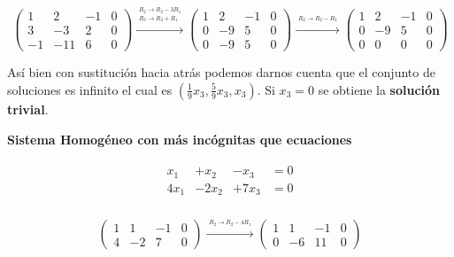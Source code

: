 \documentclass{article}
\begin{document}
\begin{equation}
    \left(\begin{array}{rrr|r}
        1 & 2 & -1 & 0 \\
        3 & -3 & 2 & 0 \\
        -1 & -11 & 6 & 0
    \end{array}\right) 
    \xrightarrow{\overset{\begin{aligned} R_2 \rightarrow R_2 - 3R_1 \\ R_3 \rightarrow R_3 + R_1\end{aligned}}{}} 
    \left(\begin{array}{rrr|r}
        1 & 2 & -1 & 0 \\
        0 & -9 & 5 & 0 \\
        0 & -9 & 5 & 0
    \end{array}\right)
    \xrightarrow{\overset{\begin{aligned} R_2 \rightarrow R_2 -R_3\end{aligned}}{}} 
    \left(\begin{array}{rrr|r}
        1 & 2 & -1 & 0 \\
        0 & -9 & 5 & 0 \\
        0 & 0 & 0 & 0
    \end{array}\right)
\end{equation}

Así bien con sustitución hacia atrás podemos darnos cuenta que el conjunto de soluciones es infinito el cual es $(\frac{1}{9} x_3, \frac{5}{9} x_3, x_3)$. Si $x_3 = 0$ se obtiene la \textbf{solución trivial}.

\begin{large}
    \textbf{Sistema Homogéneo con más incógnitas que ecuaciones}
\end{large}


\begin{equation*}
    \begin{matrix}
        \begin{aligned}
            x_1 & +x_2 & -x_3 & =0\\
            4x_1 & -2x_2 & +7x_3 & =0\\
        \end{aligned}
    \end{matrix}
\end{equation*}

\begin{equation}
    \left(\begin{array}{rrr|r}
        1 & 1 & -1 & 0 \\
        4 & -2 & 7 & 0 
    \end{array}\right) 
    \xrightarrow{\overset{\begin{aligned} R_2 \rightarrow R_2 - 4R_1 \end{aligned}}{}} 
    \left(\begin{array}{rrr|r}
        1 & 1 & -1 & 0 \\
        0 & -6 & 11 & 0
    \end{array}\right)
\end{equation}
\end{document}

